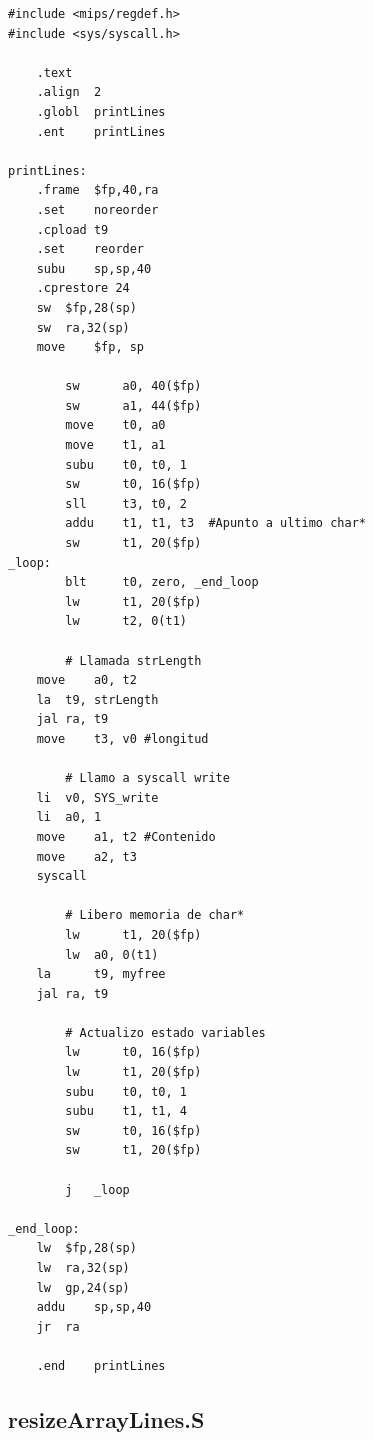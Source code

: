 \documentclass[a4paper,11pt]{article}
\begin{document}
\lstset{language=[x86masm]Assembler, breaklines=true, basicstyle=\normalsize}
\begin{lstlisting}
#include <mips/regdef.h>
#include <sys/syscall.h>

	.text
	.align	2
	.globl	printLines
	.ent	printLines

printLines:
	.frame	$fp,40,ra	
	.set	noreorder
	.cpload	t9
	.set	reorder
	subu 	sp,sp,40
	.cprestore 24
	sw	$fp,28(sp) 
	sw	ra,32(sp)
	move 	$fp, sp

        sw      a0, 40($fp)
        sw      a1, 44($fp)
        move    t0, a0
        move    t1, a1
        subu    t0, t0, 1
        sw      t0, 16($fp)
        sll     t3, t0, 2   
        addu    t1, t1, t3  #Apunto a ultimo char*
        sw      t1, 20($fp)
_loop:  
        blt     t0, zero, _end_loop
        lw      t1, 20($fp)
        lw      t2, 0(t1)

        # Llamada strLength
	move 	a0, t2
	la	t9, strLength 
	jal	ra, t9
	move	t3, v0 #longitud

        # Llamo a syscall write
	li	v0, SYS_write 
	li	a0, 1   
	move 	a1, t2 #Contenido
	move	a2, t3    
	syscall

        # Libero memoria de char*
        lw      t1, 20($fp)
        lw 	a0, 0(t1)		
	la      t9, myfree
	jal	ra, t9

        # Actualizo estado variables
        lw      t0, 16($fp)
        lw      t1, 20($fp)
        subu    t0, t0, 1
        subu    t1, t1, 4
        sw      t0, 16($fp)
        sw      t1, 20($fp)

        j   _loop

_end_loop:
	lw	$fp,28(sp)
	lw	ra,32(sp)
	lw	gp,24(sp)
	addu	sp,sp,40
	jr	ra

	.end	printLines
\end{lstlisting}

\subsection{resizeArrayLines.S}
\end{document}
